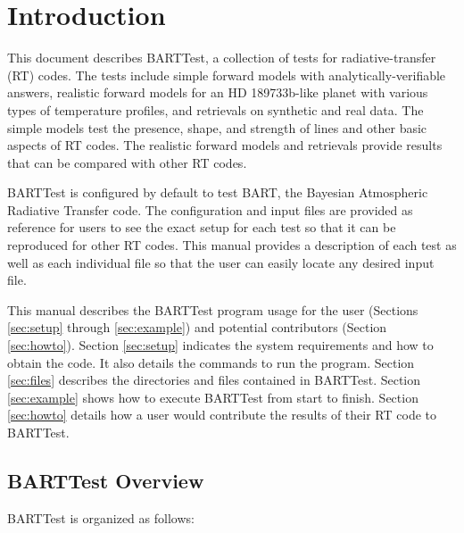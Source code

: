 \documentclass[letterpaper, 12pt]{article}
\begin{document}
\section{Introduction}
\label{sec:intro}

This document describes BARTTest, a collection of tests for 
radiative-transfer (RT) codes. The tests include simple forward models with 
analytically-verifiable answers, realistic forward models for an 
HD 189733b-like planet with various types of temperature profiles, and 
retrievals on synthetic and real data. The simple models test the 
presence, shape, and strength of lines and other basic aspects of RT codes. 
The realistic forward models and retrievals provide results that can be 
compared with other RT codes.

BARTTest is configured by default to test BART, the Bayesian Atmospheric 
Radiative Transfer code. The configuration and input files are provided 
as reference for users to see the exact setup for each test so that it 
can be reproduced for other RT codes. This manual provides a description 
of each test as well as each individual file so that the user can easily 
locate any desired input file.

This manual describes the BARTTest program usage for the user
(Sections \ref{sec:setup} through \ref{sec:example}) and
potential contributors (Section
\ref{sec:howto}).  Section
\ref{sec:setup} indicates the system requirements and how to obtain the code. 
It also details the commands to run the program.
Section \ref{sec:files} describes the directories and files contained in 
BARTTest.  Section \ref{sec:example} shows how to execute BARTTest from start 
to finish.  Section \ref{sec:howto} details how a user would contribute the 
results of their RT code to BARTTest. 

\newpage

\subsection{BARTTest Overview}

\noindent BARTTest is organized as follows:

\vspace{0.7cm}
\end{document}
